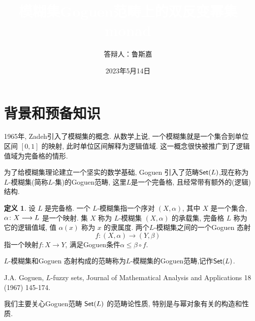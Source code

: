 \documentclass[UTF8]{beamer}
\title{\textcolor{white}{模糊集Goguen范畴上的双反变幂集monad}}
\author{ 答辩人：鲁斯嘉}
\institute
{\begin{center}
\large{指导老师：张德学
\ \\

\ \\

\ \\
四川大学数学学院}
\end{center}
}
\date{2023年5月14日}
\theoremstyle{definition}
\newtheorem{thm}{定理}[section]
\theoremstyle{definition}
\newtheorem{defn}[thm]{定义}
\numberwithin{equation}{section}
\begin{document}
	


\begin{frame}
\titlepage %
\end{frame}
\section{背景和预备知识}

\begin{frame}
1965年, %
Zadeh引入了模糊集的概念. 从数学上说, 一个模糊集就是一个集合到单位区间 $[0,1]$ 的映射, 此时单位区间解释为逻辑值域. 这一概念很快被推广到了逻辑值域为完备格的情形. 
\end{frame}

\begin{frame}
为了给模糊集理论建立一个坚实的数学基础, Goguen 引入了范畴${\sf Set}(L)$,现在称为$L$-模糊集(简称$L$-集)的Goguen范畴, 这里$L$是一个完备格, 且经常带有额外的(逻辑)结构.
\end{frame}

\begin{frame}
\begin{defn}
设 $L$ 是完备格. 一个 $L$-模糊集指一个序对 $(X,\alpha)$, 其中 $X$ 是一个集合, $\alpha\colon X\longrightarrow L$ 是一个映射. 集 $X$ 称为 $L$-模糊集  $(X,\alpha)$ 的承载集, 完备格 $L$ 称为它的逻辑值域, 值 $\alpha(x)$ 称为 $x$ 的隶属度.%
两个$L$-模糊集之间的一个Goguen 态射$$f\colon(X,\alpha)\longrightarrow(Y,\beta)$$指一个映射$f\colon X\longrightarrow Y$,    满足Goguen条件$\alpha\le\beta\circ f.$ 

$L$-模糊集和Goguen 态射构成的范畴称为$L$-模糊集的Goguen范畴,记作${\sf Set}(L)$.
\end{defn}
{\footnotesize
J.A. Goguen, $L$-fuzzy sets, Journal of Mathematical Analysis and Applications 18 (1967) 145-174.}
\end{frame}

\begin{frame} {}

我们主要关心Goguen范畴 ${\sf Set}(L)$ 的范畴论性质, 特别是与幂对象有关的构造和性质.
\end{frame}

\end{document}
